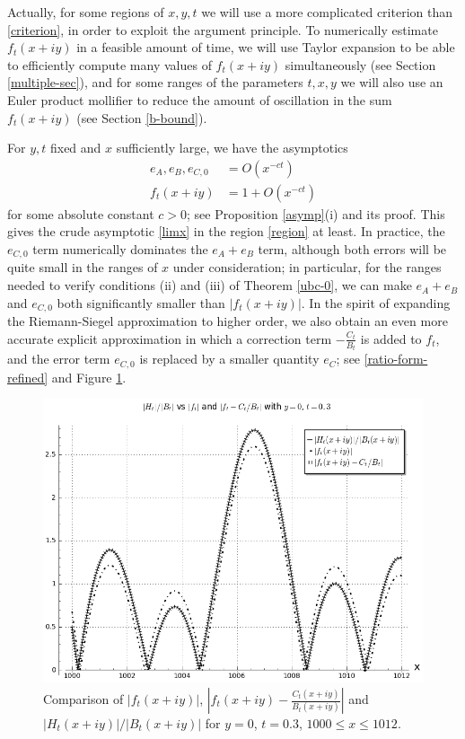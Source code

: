 \documentclass[a4paper,11pt,twoside]{amsart}
\begin{document}
Actually, for some regions of $x,y,t$ we will use a more complicated criterion than \eqref{criterion}, in order to exploit the argument principle.  To numerically estimate $f_t(x+iy)$ in a feasible amount of time, we will use Taylor expansion to be able to efficiently compute many values of $f_t(x+iy)$ simultaneously (see Section \ref{multiple-sec}), and for some ranges of the parameters $t,x,y$ we will also use an Euler product mollifier to reduce the amount of oscillation in the sum $f_t(x+iy)$ (see Section \ref{b-bound}).

For $y,t$ fixed and $x$ sufficiently large, we have the asymptotics
\begin{align*}
e_A,e_B, e_{C,0} &= O( x^{-ct} )\\
f_t(x+iy) &= 1 + O(x^{-ct} )
\end{align*}
for some absolute constant $c>0$; see Proposition \ref{asymp}(i) and its proof.  This gives the crude asymptotic \eqref{limx} in the region \eqref{region} at least.   In practice, the $e_{C,0}$ term numerically dominates the $e_A+e_B$ term, although both errors will be quite small in the ranges of $x$ under consideration; in particular, for the ranges needed to verify conditions (ii) and (iii) of Theorem \ref{ubc-0}, we can make $e_A+e_B$ and $e_{C,0}$ both significantly smaller than $|f_t(x+iy)|$.  In the spirit of expanding the Riemann-Siegel approximation to higher order, we also obtain an even more accurate explicit approximation in which a correction term $-\frac{C_t}{B_t}$ is added to $f_t$, and the error term $e_{C,0}$ is replaced by a smaller quantity $e_C$; see \eqref{ratio-form-refined} and Figure \ref{htft-c}.

\begin{figure}[ht!]
  \includegraphics[width=0.6\linewidth]{Extra_RS_term.png}
  \caption{Comparison of $|f_t(x+iy)|$, $|f_t(x+iy)-\frac{C_t(x+iy)}{B_t(x+iy)}|$ and $|H_t(x+iy)|/|B_t(x+iy)|$ for $y=0$, $t=0.3$, $1000 \leq x \leq 1012$.}
	\label{htft-c}
\end{figure}
\end{document}
